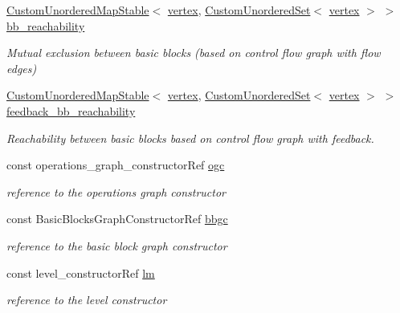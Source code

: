 \begin{DoxyCompactItemize}
\item 
\hyperlink{custom__map_8hpp_a7314a7df1cdb3a3acf478ab86e95c226}{Custom\+Unordered\+Map\+Stable}$<$ \hyperlink{graph_8hpp_abefdcf0544e601805af44eca032cca14}{vertex}, \hyperlink{classCustomUnorderedSet}{Custom\+Unordered\+Set}$<$ \hyperlink{graph_8hpp_abefdcf0544e601805af44eca032cca14}{vertex} $>$ $>$ \hyperlink{classFunctionBehavior_aab2576b9f84ed141a041f258ee41edff}{bb\+\_\+reachability}
\begin{DoxyCompactList}\small\item\em Mutual exclusion between basic blocks (based on control flow graph with flow edges) \end{DoxyCompactList}\item 
\hyperlink{custom__map_8hpp_a7314a7df1cdb3a3acf478ab86e95c226}{Custom\+Unordered\+Map\+Stable}$<$ \hyperlink{graph_8hpp_abefdcf0544e601805af44eca032cca14}{vertex}, \hyperlink{classCustomUnorderedSet}{Custom\+Unordered\+Set}$<$ \hyperlink{graph_8hpp_abefdcf0544e601805af44eca032cca14}{vertex} $>$ $>$ \hyperlink{classFunctionBehavior_ad606d4872a75037e3693e2e4f4b6f143}{feedback\+\_\+bb\+\_\+reachability}
\begin{DoxyCompactList}\small\item\em Reachability between basic blocks based on control flow graph with feedback. \end{DoxyCompactList}\item 
const operations\+\_\+graph\+\_\+constructor\+Ref \hyperlink{classFunctionBehavior_a26bfae64c02d06004c933aac54a80ac6}{ogc}
\begin{DoxyCompactList}\small\item\em reference to the operations graph constructor \end{DoxyCompactList}\item 
const Basic\+Blocks\+Graph\+Constructor\+Ref \hyperlink{classFunctionBehavior_a7fb64321932bbdad8860fe017e6f64b5}{bbgc}
\begin{DoxyCompactList}\small\item\em reference to the basic block graph constructor \end{DoxyCompactList}\item 
const level\+\_\+constructor\+Ref \hyperlink{classFunctionBehavior_a8fd0e89ba2e18a95dcced1fdb2a813fb}{lm}
\begin{DoxyCompactList}\small\item\em reference to the level constructor \end{DoxyCompactList}\item 

\end{DoxyCompactItemize}
